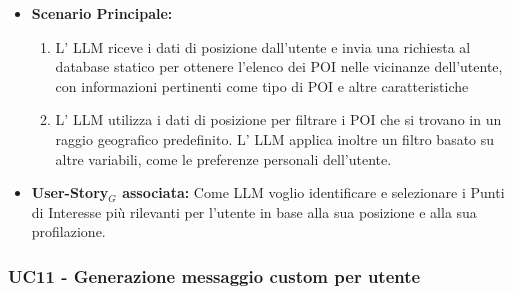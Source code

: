 \documentclass[11pt]{article}
\begin{document}
\begin{justify}
\begin{itemize}
    \item \textbf{Scenario Principale:} 
        \begin{enumerate}
        \item L' LLM riceve i dati di posizione dall'utente e invia una richiesta al database statico per ottenere l'elenco dei POI nelle vicinanze dell'utente, con informazioni pertinenti come tipo di POI e altre caratteristiche
        \item L' LLM utilizza i dati di posizione per filtrare i POI che si trovano in un raggio geografico predefinito. L' LLM applica inoltre un filtro basato su altre variabili, come le preferenze personali dell'utente.
        \end{enumerate}
    \item \textbf{User-Story$_G$ associata:} Come LLM voglio identificare e selezionare i Punti di Interesse più rilevanti per l'utente in base alla sua posizione e alla sua profilazione.
\end{itemize}


\subsubsection{\textbf{UC11 - Generazione messaggio custom per utente}}


\end{justify}
\end{document}
